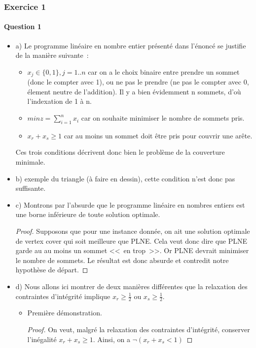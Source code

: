 \documentclass[a4paper, 12pt]{article}
\begin{document}
\subsubsection*{Exercice 1}

\paragraph{Question 1}

\begin{itemize}
\item[] a) Le programme linéaire en nombre entier présenté dans
  l'énoncé se justifie de la manière suivante~:
\begin{itemize}
\item $x_j \in \{0,1\}, j=1..n$ car on a le choix binaire entre prendre un
  sommet (donc le compter avec 1), ou ne pas le prendre (ne pas le
  compter avec 0, élement neutre de l'addition). Il y a bien
  évidemment n sommets, d'où l'indexation de 1 à n.
\item $min z = \sum^n _{i=1} x_i$ car on souhaite minimiser le nombre
  de sommets pris.
\item $x_r + x_s \geq 1$ car au moins un sommet doit être pris pour
  couvrir une arête.
\end{itemize}
Ces trois conditions décrivent donc bien le problème de la couverture minimale.
\item[] b) exemple du triangle (à faire en dessin), cette condition
  n'est donc pas suffisante.
\item[] c) Montrons par l'absurde que le programme linéaire en nombres
  entiers est une borne inférieure de toute solution optimale.
\begin{proof}
Supposons que pour une instance donnée, on ait une solution
  optimale de vertex cover qui soit meilleure que PLNE. Cela veut donc
  dire que PLNE garde au au moins un sommet <<~en trop~>>. Or PLNE
  devrait minimiser le nombre de sommets. Le résultat est donc absurde
  et contredit notre hypothèse de départ.
\end{proof}
\item[] d) Nous allons ici montrer de deux manières différentes que la
  relaxation des contraintes d'intégrité implique $x_r \geq
  \frac{1}{2}$ ou $x_s \geq \frac{1}{2}$.
\begin{itemize}
\item Première démonstration.
\begin{proof}
On veut, malgré la relaxation des contraintes d'intégrité, conserver
l'inégalité $x_r + x_s \geq 1$. Ainsi, on a $\neg (x_r + x_s < 1)$

\end{proof}
\end{itemize}
\end{itemize}
\end{document}
